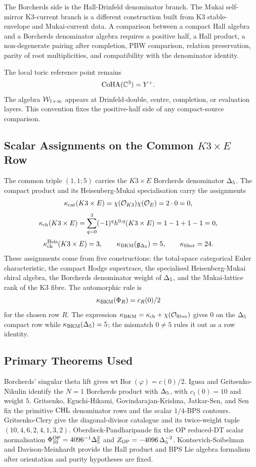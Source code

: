 The Borcherds side is the Hall-Drinfeld denominator branch.  The
Mukai self-mirror K3-current branch is a different construction built
from K3 stable-envelope and Mukai-current data.  A comparison between a
compact Hall algebra and a Borcherds denominator algebra requires a
positive half, a Hall product, a non-degenerate pairing after completion,
PBW comparison, relation preservation, parity of root multiplicities,
and compatibility with the denominator identity.

The local toric reference point remains
\[
  \mathrm{CoHA}(\mathbb{C}^3)=Y^+ .
\]
The algebra \(\mathcal{W}_{1+\infty}\) appears at Drinfeld-double, centre, completion,
or evaluation layers.  This convention fixes the positive-half side of
any compact-source comparison.

\subsection*{Scalar Assignments on the Common \(K3\times E\) Row}

The common triple \((1,1;5)\) carries the \(K3\times E\) Borcherds
denominator \(\Delta_5\).  The compact product and its
Heisenberg-Mukai specialisation carry the assignments
\[
  \kappa_{\mathrm{cat}}(K3\times E)=\chi(\mathcal{O}_{K3})\chi(\mathcal{O}_E)=2\cdot0=0,
\]
\[
  \kappa_{\mathrm{ch}}(K3\times E)=
  \sum_{q=0}^{3}(-1)^q h^{0,q}(K3\times E)
  =1-1+1-1=0,
\]
\[
  \kappa_{\mathrm{ch}}^{\mathrm{Heis}}(K3\times E)=3,\qquad
  \kappa_{\mathrm{BKM}}(\mathfrak g_{\Delta_5})=5,\qquad
  \kappa_{\mathrm{fiber}}=24.
\]
These assignments come from five constructions: the total-space
categorical Euler characteristic, the compact Hodge supertrace, the
specialised Heisenberg-Mukai chiral algebra, the Borcherds denominator
weight of \(\Delta_5\), and the Mukai-lattice rank of the K3 fibre.
The automorphic rule is
\[
  \kappa_{\mathrm{BKM}}(\Phi_R)=c_R(0)/2
\]
for the chosen row \(R\).
The expression
\(\kappa_{\mathrm{BKM}}=\kappa_{\mathrm{ch}}+\chi(\mathcal{O}_{\mathrm{fiber}})\) gives \(0\) on the
\(\Delta_5\) compact row while \(\kappa_{\mathrm{BKM}}(\Delta_5)=5\); the mismatch
\(0\ne5\) rules it out as a row identity.

\subsection*{Primary Theorems Used}

Borcherds' singular theta lift gives
\(\mathrm{wt}\operatorname{Bor}(\varphi)=c(0)/2\).  Igusa and
Gritsenko-Nikulin identify the \(N=1\) Borcherds product with
\(\Delta_5\), with \(c_1(0)=10\) and weight \(5\).  Gritsenko,
Eguchi-Hikami, Govindarajan-Krishna, Jatkar-Sen, and Sen fix the
primitive \(\mathrm{CHL}\) denominator rows and the scalar \(1/4\)-BPS
contours.  Gritsenko-Clery give the diagonal-divisor catalogue and its
twice-weight tuple \((10,4,6,2,4,1,3,2)\).  Oberdieck-Pandharipande
fix the OP reduced-DT scalar normalisation
\(\Phi_{10}^{\mathrm{OP}}=4096^{-1}\Delta_5^2\) and
\(Z_{\mathrm{OP}}=-4096\,\Delta_5^{-2}\).  Kontsevich-Soibelman and
Davison-Meinhardt provide the Hall product and BPS Lie algebra
formalism after orientation and purity hypotheses are fixed.

